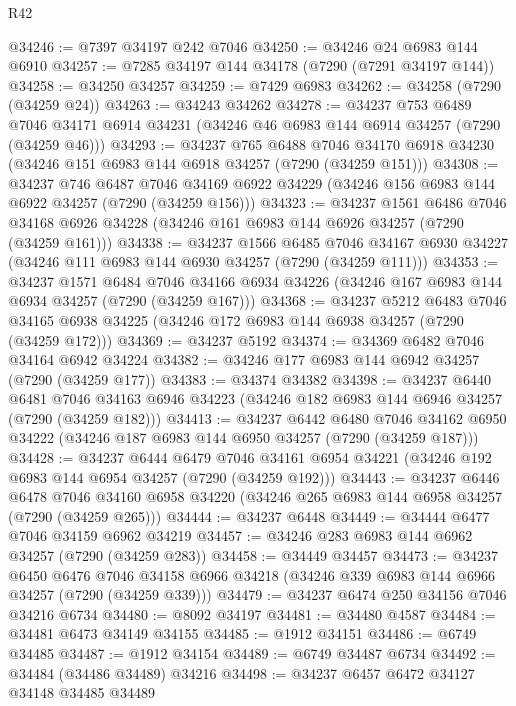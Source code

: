 \begin{lexlean}{R42}
\begin{coremodule}
{@34246 := @7397 @34197 @242 @7046
@34250 := @34246 @24 @6983 @144 @6910
@34257 := @7285 @34197 @144 @34178 (@7290 (@7291 @34197 @144))
@34258 := @34250 @34257
@34259 := @7429 @6983
@34262 := @34258 (@7290 (@34259 @24))
@34263 := @34243 @34262
@34278 := @34237
    @753
    @6489
    @7046
    @34171
    @6914
    @34231
    (@34246 @46 @6983 @144 @6914 @34257 (@7290 (@34259 @46)))
@34293 := @34237
    @765
    @6488
    @7046
    @34170
    @6918
    @34230
    (@34246 @151 @6983 @144 @6918 @34257 (@7290 (@34259 @151)))
@34308 := @34237
    @746
    @6487
    @7046
    @34169
    @6922
    @34229
    (@34246 @156 @6983 @144 @6922 @34257 (@7290 (@34259 @156)))
@34323 := @34237
    @1561
    @6486
    @7046
    @34168
    @6926
    @34228
    (@34246 @161 @6983 @144 @6926 @34257 (@7290 (@34259 @161)))
@34338 := @34237
    @1566
    @6485
    @7046
    @34167
    @6930
    @34227
    (@34246 @111 @6983 @144 @6930 @34257 (@7290 (@34259 @111)))
@34353 := @34237
    @1571
    @6484
    @7046
    @34166
    @6934
    @34226
    (@34246 @167 @6983 @144 @6934 @34257 (@7290 (@34259 @167)))
@34368 := @34237
    @5212
    @6483
    @7046
    @34165
    @6938
    @34225
    (@34246 @172 @6983 @144 @6938 @34257 (@7290 (@34259 @172)))
@34369 := @34237 @5192
@34374 := @34369 @6482 @7046 @34164 @6942 @34224
@34382 := @34246 @177 @6983 @144 @6942 @34257 (@7290 (@34259 @177))
@34383 := @34374 @34382
@34398 := @34237
    @6440
    @6481
    @7046
    @34163
    @6946
    @34223
    (@34246 @182 @6983 @144 @6946 @34257 (@7290 (@34259 @182)))
@34413 := @34237
    @6442
    @6480
    @7046
    @34162
    @6950
    @34222
    (@34246 @187 @6983 @144 @6950 @34257 (@7290 (@34259 @187)))
@34428 := @34237
    @6444
    @6479
    @7046
    @34161
    @6954
    @34221
    (@34246 @192 @6983 @144 @6954 @34257 (@7290 (@34259 @192)))
@34443 := @34237
    @6446
    @6478
    @7046
    @34160
    @6958
    @34220
    (@34246 @265 @6983 @144 @6958 @34257 (@7290 (@34259 @265)))
@34444 := @34237 @6448
@34449 := @34444 @6477 @7046 @34159 @6962 @34219
@34457 := @34246 @283 @6983 @144 @6962 @34257 (@7290 (@34259 @283))
@34458 := @34449 @34457
@34473 := @34237
    @6450
    @6476
    @7046
    @34158
    @6966
    @34218
    (@34246 @339 @6983 @144 @6966 @34257 (@7290 (@34259 @339)))
@34479 := @34237 @6474 @250 @34156 @7046 @34216 @6734
@34480 := @8092 @34197
@34481 := @34480 @4587
@34484 := @34481 @6473 @34149 @34155
@34485 := @1912 @34151
@34486 := @6749 @34485
@34487 := @1912 @34154
@34489 := @6749 @34487 @6734
@34492 := @34484 (@34486 @34489) @34216
@34498 := @34237 @6457 @6472 @34127 @34148 @34485 @34489
}
\end{coremodule}
\end{lexlean}
